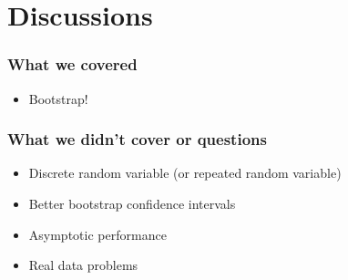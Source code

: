 \documentclass{beamer}
\begin{document}
\section{Discussions}
\begin{frame}
\frametitle{What we covered}
\begin{itemize}
\item Bootstrap!
\end{itemize}
\end{frame}
\begin{frame}
\frametitle{What we didn't cover or questions}
\begin{itemize}
\item Discrete random variable (or repeated random variable)
\item Better bootstrap confidence intervals
\item Asymptotic performance
\item Real data problems
\end{itemize}
\end{frame}
\end{document}
